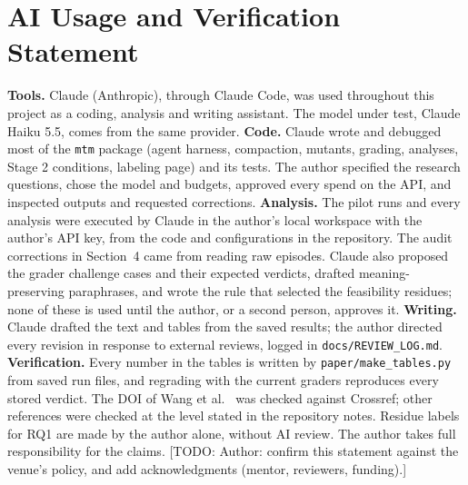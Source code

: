 \documentclass[10pt]{article}
\theoremstyle{definition}
\newcommand{\todo}[1]{\textcolor{BrickRed}{[TODO: #1]}}
\begin{document}
\section{AI Usage and Verification Statement}
\textbf{Tools.} Claude (Anthropic), through Claude Code, was used throughout this project as a coding, analysis and writing assistant. The model under test, Claude Haiku 5.5, comes from the same provider. \textbf{Code.} Claude wrote and debugged most of the \texttt{mtm} package (agent harness, compaction, mutants, grading, analyses, Stage 2 conditions, labeling page) and its tests. The author specified the research questions, chose the model and budgets, approved every spend on the API, and inspected outputs and requested corrections. \textbf{Analysis.} The pilot runs and every analysis were executed by Claude in the author's local workspace with the author's API key, from the code and configurations in the repository. The audit corrections in Section~4 came from reading raw episodes. Claude also proposed the grader challenge cases and their expected verdicts, drafted meaning-preserving paraphrases, and wrote the rule that selected the feasibility residues; none of these is used until the author, or a second person, approves it. \textbf{Writing.} Claude drafted the text and tables from the saved results; the author directed every revision in response to external reviews, logged in \texttt{docs/REVIEW\_LOG.md}. \textbf{Verification.} Every number in the tables is written by \texttt{paper/make\_tables.py} from saved run files, and regrading with the current graders reproduces every stored verdict. The DOI of Wang et al.~\cite{wang2024} was checked against Crossref; other references were checked at the level stated in the repository notes. Residue labels for RQ1 are made by the author alone, without AI review. The author takes full responsibility for the claims.
\todo{Author: confirm this statement against the venue's policy, and add acknowledgments (mentor, reviewers, funding).}
\end{document}
